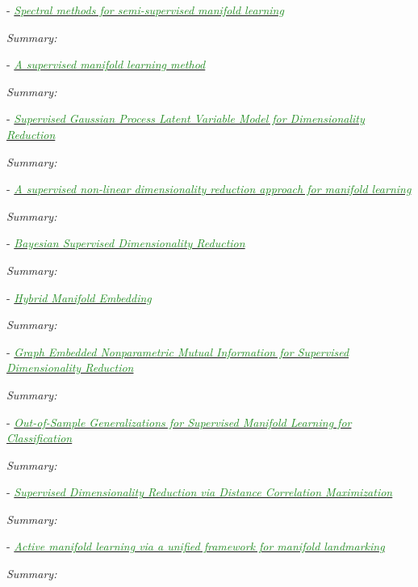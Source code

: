 \documentclass[]{article}
\newcommand{\paperentry}[4]{
            \hangindent=1cm
            \textcolor{red}{\cite{#1}} - \href{run:../References/#3}{\textcolor{ForestGreen}{\textit{#2}}}
            
            \noindent            
            \begin{minipage}[t]{0.1\linewidth}\hfill\end{minipage}
            \begin{minipage}[t]{0.8\linewidth}\textcolor{NavyBlue}{{\textit{Summary:}}}#4\end{minipage}
            \vspace{.25cm}
          }
\begin{document}
	\paperentry{Zhang2008SpectralSemiSupManifoldLearning}
	{Spectral methods for semi-supervised manifold learning}
	{Manifold_Representation_Learning/Supervised/Zhang2008SpectralSemiSupManifoldLearning.pdf}
	{}
	
	\paperentry{Li2009SupManifoldLearning}
	{A supervised manifold learning method}
	{Manifold_Representation_Learning/Supervised/Li2009SupManifoldLearning.pdf}
	{}
	
	\paperentry{Gao2011SupGPLVMDimRed}
	{Supervised Gaussian Process Latent Variable Model for Dimensionality Reduction}
	{Manifold_Representation_Learning/Supervised/Gao2011SupGPLVMDimRed.pdf}
	{}
	
	
	\paperentry{Raducanu2012SupervisedNonlinearDimReduction}
	{A supervised non-linear dimensionality reduction approach for manifold learning}
	{Manifold_Representation_Learning/Supervised/Raducanu2012SupervisedNonlinearDimReduction.pdf}
	{}
	
	\paperentry{Gonen2013BayesianSupDimRed}
	{Bayesian Supervised Dimensionality Reduction}
	{Manifold_Representation_Learning/Supervised/Gonen2013BayesianSupDimRed.pdf}
	{}
	
	\paperentry{Liu2014HybridManifoldEmbedding}
	{Hybrid Manifold Embedding}
	{Manifold_Representation_Learning/Supervised/Liu2014HybridManifoldEmbedding.pdf}
	{}
	
	\paperentry{Bouzas2015GraphEmbeddedMutualInformationSupDimRed}
	{Graph Embedded Nonparametric Mutual Information for Supervised Dimensionality Reduction}
	{Manifold_Representation_Learning/Supervised/Bouzas2015GraphEmbeddedMutualInformationSupDimRed.pdf}
	{}
	
	\paperentry{Vural2016OutOfSampleSupManifoldLearning}
	{Out-of-Sample Generalizations for Supervised Manifold Learning for Classification}
	{Manifold_Representation_Learning/Supervised/Vural2016OutOfSampleSupManifoldLearning.pdf}
	{}
	
	
	\paperentry{Vepakomma2016SupDimRedDistanceCorrelationMax}
	{Supervised Dimensionality Reduction via Distance Correlation Maximization}
	{Manifold_Representation_Learning/Supervised/Vepakomma2016SupDimRedDistanceCorrelationMax.pdf}
	{}
	
	\paperentry{Xu2017ActiveManifoldLearning}
	{Active manifold learning via a unified framework for manifold landmarking}
	{Manifold_Representation_Learning/Supervised/Xu2017ActiveManifoldLearning.pdf}
	{}
	
\end{document}

